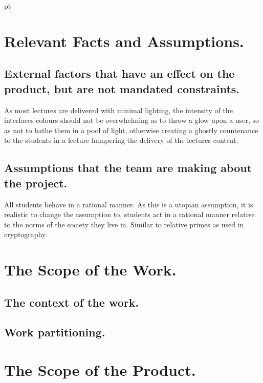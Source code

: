  pt

\section{Relevant Facts and Assumptions.}

\subsection{External factors that have an effect on the product, but are not mandated constraints.}

As most lectures are delivered with minimal lighting, the intensity of the interfaces colours should not be overwhelming as to throw a glow upon a user, so as not to bathe them in a pool of light, otherwise creating a ghostly countenance to the students in a lecture hampering the delivery of the lectures content.

\subsection{Assumptions that the team are making about the project.}

All students behave in a rational manner. As this is a utopian assumption, it is realistic to change the assumption to, students act in a rational manner relative to the norms of the society they live in. Similar to relative primes as used in cryptography.


\section{The Scope of the Work.}

\subsection{The context of the work.}

\NA

\subsection{Work partitioning.}

\NA

\section{The Scope of the Product.}

